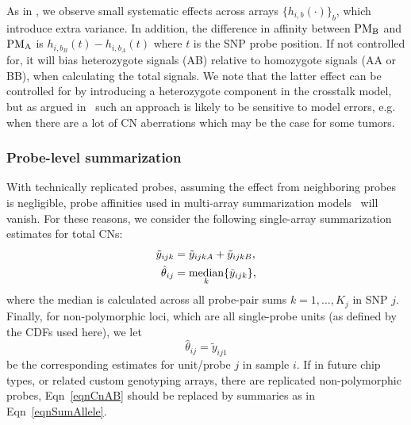 \documentclass{bioinfo}
\newcommand{\GWS}{GWS\xspace}
\newcommand{\PMA}{\ensuremath{\textnormal{PM}_\textnormal{A}}\xspace}
\newcommand{\PMB}{\ensuremath{\textnormal{PM}_\textnormal{B}}\xspace}
\DeclareMathOperator{\median}{\textnormal{median}}
\begin{document}
As in \citet{CarvalhoB_etal_2007}, we observe small systematic effects across arrays $\{h_{i,b}(\cdot)\}_b$, which introduce extra variance.  In addition, the difference in affinity between \PMB and \PMA is $h_{i,b_B}(t) - h_{i,b_A}(t)$ where $t$ is the SNP probe position.  If not controlled for, it will bias heterozygote signals (AB) relative to homozygote signals (AA or BB), when calculating the total signals.
We note that the latter effect can be controlled for by introducing a heterozygote component in the crosstalk model, but as argued in~\citet{BengtssonH_etal_2008} such an approach is likely to be sensitive to model errors, e.g. when there are a lot of CN aberrations which may be the case for some tumors.


\subsubsection{Probe-level summarization}
\label{secSummarizationModel}
With technically replicated probes, assuming the effect from neighboring probes is negligible, probe affinities used in multi-array summarization models~\citep{BengtssonH_etal_2008} will vanish.
For these reasons, we consider the following single-array summarization estimates for total CNs:
\begin{align}
  \tilde{y}_{ijk} &= \tilde{y}_{ijkA} + \tilde{y}_{ijkB}, \notag \\
  \hat{\theta}_{ij} &= \median_{k} \{\tilde{y}_{ijk}\},
  \label{eqnSumAllele}
\end{align}
where the median is calculated across all probe-pair sums $k=1,\ldots,K_j$ in SNP $j$.
Finally, for non-polymorphic loci, which are all single-probe units (as defined by the CDFs used here), we let
\begin{equation}
  \hat{\theta}_{ij} = \tilde{y}_{ij1}
  \label{eqnCnAB}
\end{equation}
be the corresponding estimates for unit/probe $j$ in sample $i$.  If in future chip types, or related custom genotyping arrays, there are replicated non-polymorphic probes, Eqn~\eqref{eqnCnAB} should be replaced by summaries as in Eqn~\eqref{eqnSumAllele}.  
\end{document}
